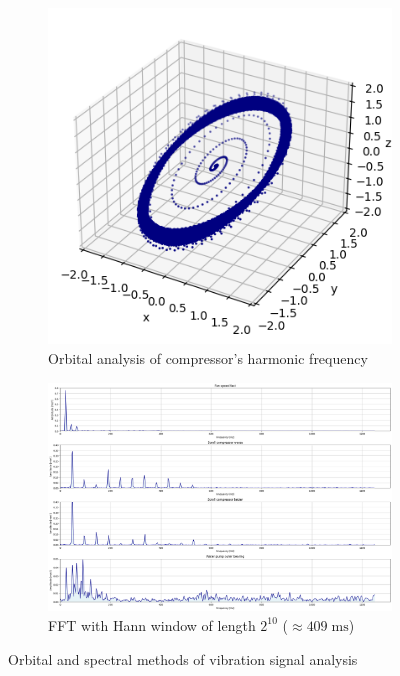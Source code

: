 \begin{figure}[ht]
    \centering
    \begin{subfigure}[b]{0.45\textwidth}
        \includegraphics[width=\textwidth]{assets/design/compressor-orbitals-1x.png}
		\caption{Orbital analysis of compressor's  harmonic frequency}
		\label{fig:design:orbital-analysis}
    \end{subfigure}
    \hfill
    \begin{subfigure}[b]{0.54\textwidth}
        \includegraphics[width=\textwidth]{assets/design/EDA-custom-dataset-spectral-X-axis.png}
        \caption{FFT with Hann window of length $2^{10}$ ($\approx 409\;\mathrm{ms}$)}
        \label{fig:design:preliminary-spectrum}
    \end{subfigure} 
    \caption{Orbital and spectral methods of vibration signal analysis}
\end{figure}
